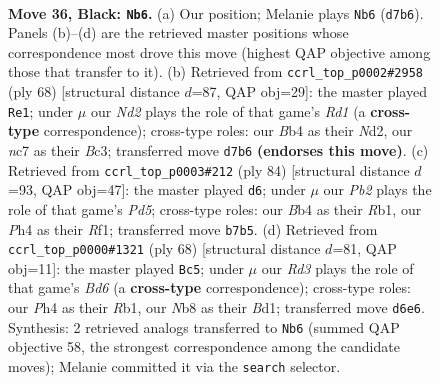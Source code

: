 \documentclass[11pt]{article}
\begin{document}
\clearpage

\begin{figure}[p]\centering
\begin{subfigure}{0.46\textwidth}\centering
\resizebox{\linewidth}{!}{%
\newchessgame
\chessboard[
  setfen={1nb2k2/1pNn4/3r1p2/p2p2p1/1b4Pp/1P2P2P/PB2PK2/2RB4 b - - 7 36},
  showmover=false,
  pgfstyle=straightmove, color=movearrow, markmove={d7-b6}
]}
\caption{}
\end{subfigure}\hfill
\begin{subfigure}{0.46\textwidth}\centering
\resizebox{\linewidth}{!}{%
\newchessgame
\chessboard[
  setfen={5b2/1r6/1n2ppk1/1rp3p1/p3P2p/2B4P/PPRN1PP1/3R1K2 w - - 5 35},
  showmover=false,
  pgfstyle=straightmove, color=movearrow, markmove={d1-e1}
]}
\caption{}
\end{subfigure}
\\[4pt]
\begin{subfigure}{0.46\textwidth}\centering
\resizebox{\linewidth}{!}{%
\newchessgame
\chessboard[
  setfen={r1b2bk1/p1B2p2/8/2nP4/r2pP1p1/3P2P1/4BP1P/1R3RNK w - - 3 43},
  showmover=false,
  pgfstyle=straightmove, color=movearrow, markmove={d5-d6}
]}
\caption{}
\end{subfigure}\hfill
\begin{subfigure}{0.46\textwidth}\centering
\resizebox{\linewidth}{!}{%
\newchessgame
\chessboard[
  setfen={r1n3k1/3b2pp/2nBp3/p2pP3/2p2P2/2P1KN2/2P3PP/1R1B4 w - - 5 35},
  showmover=false,
  pgfstyle=straightmove, color=movearrow, markmove={d6-c5}
]}
\caption{}
\end{subfigure}
\caption{\textbf{Move 36, Black: \texttt{Nb6}.} (a) Our position; Melanie plays \texttt{Nb6} (\texttt{d7b6}). Panels (b)--(d) are the retrieved master positions whose correspondence most drove this move (highest QAP objective among those that transfer to it). (b) Retrieved from \texttt{ccrl\_top\_p0002\#2958} (ply 68) [structural distance $d$=87, QAP obj=29]: the master played \texttt{Re1}; under $\mu$ our \emph{Nd2} plays the role of that game's \emph{Rd1} (a \textbf{cross-type} correspondence); cross-type roles: our \emph{B}b4 as their \emph{N}d2, our \emph{n}c7 as their \emph{B}c3; transferred move \texttt{d7b6} \textbf{(endorses this move)}. (c) Retrieved from \texttt{ccrl\_top\_p0003\#212} (ply 84) [structural distance $d$=93, QAP obj=47]: the master played \texttt{d6}; under $\mu$ our \emph{Pb2} plays the role of that game's \emph{Pd5}; cross-type roles: our \emph{B}b4 as their \emph{R}b1, our \emph{P}h4 as their \emph{R}f1; transferred move \texttt{b7b5}. (d) Retrieved from \texttt{ccrl\_top\_p0000\#1321} (ply 68) [structural distance $d$=81, QAP obj=11]: the master played \texttt{Bc5}; under $\mu$ our \emph{Rd3} plays the role of that game's \emph{Bd6} (a \textbf{cross-type} correspondence); cross-type roles: our \emph{P}h4 as their \emph{R}b1, our \emph{N}b8 as their \emph{B}d1; transferred move \texttt{d6e6}. Synthesis: 2 retrieved analogs transferred to \texttt{Nb6} (summed QAP objective 58, the strongest correspondence among the candidate moves); Melanie committed it via the \texttt{search} selector.}
\label{fig:thought-m71}
\end{figure}
\end{document}
